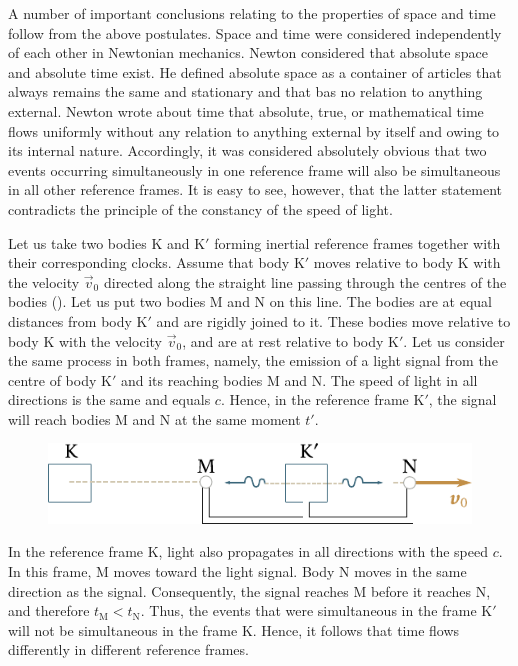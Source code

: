A number of important conclusions relating to the properties of space and time follow from the above postulates. Space and time were considered independently of each other in Newtonian mechanics. Newton considered that absolute space and absolute time exist. He defined absolute space as a container of articles that always remains the same and stationary and that bas no relation to anything external. Newton wrote about time that absolute, true, or mathematical time flows uniformly without any relation to anything external by itself and owing to its internal nature. Accordingly, it was considered absolutely obvious that two events occurring simultaneously in one reference frame will also be simultaneous in all other reference frames. It is easy to see, however, that the latter statement contradicts the principle of the constancy of the speed of light.

Let us take two bodies K and K$'$ forming inertial reference frames together with their corresponding clocks. Assume that body K$'$ moves relative to body K with the velocity $\vec{v}_0$ directed along the straight line passing through the centres of the bodies (). Let us put two bodies M and N on this line. The bodies are at equal distances from body K$'$ and are rigidly joined to it. These bodies move relative to body K with the velocity $\vec{v}_0$, and are at rest relative to body K$'$. Let us consider the same process in both frames, namely, the emission of a light signal from the centre of body K$'$ and its reaching bodies M and N. The speed of light in all directions is the same and equals $c$. Hence, in the reference frame K$'$, the signal will reach bodies M and N at the same moment $t'$.

\begin{figure}[t]
	\begin{center}
		\includegraphics[scale=0.95]{figures/ch_08/fig_8_1.pdf}
		\caption[]{}
		\label{fig:8_1}
	\end{center}
	\vspace{-0.8cm}
\end{figure}

In the reference frame K, light also propagates in all directions with the speed $c$. In this frame, M moves toward the light signal. Body N moves in the same direction as the signal. Consequently, the signal reaches M before it reaches N, and therefore $t_{\text{M}}<t_{\text{N}}$. Thus, the events that were simultaneous in the frame K$'$ will not be simultaneous in the frame K. Hence, it follows that time flows differently in different reference frames.

